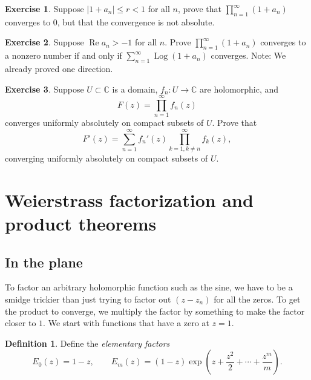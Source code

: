 \documentclass[12pt,openany]{book}
\renewcommand{\Re}{\operatorname{Re}}
\newcommand{\Log}{\operatorname{Log}}
\newcommand{\sabs}[1]{\lvert {#1} \rvert}
\newcommand{\C}{{\mathbb{C}}}
\newcommand{\myindex}[1]{#1\index{#1}}
\theoremstyle{plain}
\theoremstyle{remark}
\theoremstyle{definition}
\newtheorem{defn}[thm]{Definition}
\newenvironment{exbox}{%
    \def\FrameCommand{\vrule width 1pt \relax\hspace{10pt}}%
    \MakeFramed{\advance\hsize-\width\FrameRestore}%
}{%
    \endMakeFramed
}
\theoremstyle{exercise}
\newtheorem{exercise}{Exercise}[section]
\theoremstyle{example}
\begin{document}
\begin{exbox}
\begin{exercise}
Suppose $\sabs{1+a_n} \leq r < 1$ for all
$n$, 
prove that $\prod_{n=1}^\infty (1+a_n)$ converges to 0, but that the
convergence is not absolute.
\end{exercise}

\begin{exercise}
Suppose $\Re a_n > -1$ for all $n$.  
Prove 
$\prod_{n=1}^\infty (1+a_n)$
converges to a nonzero number if and only if
$\sum_{n=1}^\infty \Log (1+a_n)$ converges.  Note: We already proved one
direction.
\end{exercise}

\begin{exercise}%
\label{exercise:proddiff}
Suppose $U \subset \C$ is a domain,
$f_n \colon U \to \C$ are holomorphic, and
\begin{equation*}
F(z) = \prod_{n=1}^\infty f_n(z)
\end{equation*}
converges uniformly absolutely
on compact subsets of $U$.  Prove that
\begin{equation*}
F'(z) = \sum_{n=1}^\infty f_n'(z) \prod_{k=1, k\not=n}^\infty f_k(z) ,
\end{equation*}
converging uniformly absolutely on compact subsets of $U$.
\end{exercise}
\end{exbox}


\section{Weierstrass factorization and product theorems}
\label{sec:weier}

\subsection{In the plane}

To factor an arbitrary holomorphic function such as the sine,
we have to be a smidge trickier than just trying to factor out $(z-z_n)$
for all the zeros.  To
get the product to converge, we multiply the factor by something to
make the factor closer to $1$.  We start with functions that have a zero at
$z=1$.

\begin{defn}
Define the \emph{\myindex{elementary factors}}
%
\begin{equation*}
E_0(z) = 1-z, \qquad
E_m(z) = (1-z) \exp\left( z +\frac{z^2}{2} + \cdots + \frac{z^m}{m} \right)
.
\end{equation*}
\end{defn}
\end{document}
